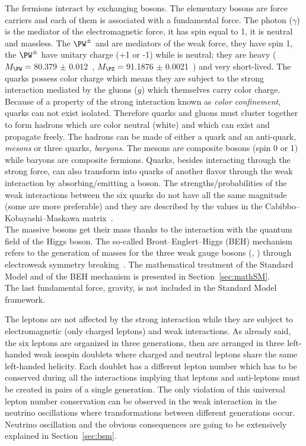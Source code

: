 The fermions interact by exchanging bosons. The elementary bosons are force carriers and each of them is associated with a fundamental force. The photon ($\gamma$) is the mediator of the electromagnetic force, it has spin equal to 1, it is neutral and massless. The $\PW^{\pm}$ and \PZ are mediators of the weak force, they have spin 1, the $\PW^{\pm}$ have unitary charge (+1 or -1) while \PZ is neutral; they are heavy ($M_\PW =\:$80.379 $\pm$ 0.012\GeV~\cite{pdgw}, $M_\PZ =\:$91.1876 $\pm$ 0.0021\GeV~\cite{pdgz}) and very short-lived. The quarks possess color charge which means they are subject to the strong interaction mediated by the gluons ($g$) which themselves carry color charge. Because of a property of the strong interaction known as \emph{color confinement}, quarks can not exist isolated. Therefore quarks and gluons must cluster together to form hadrons which are color neutral (white) and which can exist and propagate freely. The hadrons can be made of either a quark and an anti-quark, \emph{mesons} or three quarks, \emph{baryons}. The mesons are composite bosons (spin 0 or 1) while baryons are composite fermions. Quarks, besides interacting through the strong force, can also transform into quarks of another flavor through the weak interaction by absorbing/emitting a \PW boson. The strengths/probabilities of the weak interactions between the six quarks do not have all the same magnitude (some are more preferable) and they are described by the values in the Cabibbo–Kobayashi–Maskawa matrix~\cite{10.1143/PTP.28.870}.\\
The massive bosons get their mass thanks to the interaction with the quantum field of the Higgs boson. The so-called Brout–Englert–Higgs (BEH) mechanism refers to the generation of masses for the three weak gauge bosons (\PW, \PZ) through electroweak symmetry breaking~\cite{PhysRevLett.13.321,PhysRevLett.13.508}. The mathematical treatment of the Standard Model and of the BEH mechanism is presented in Section~\ref{sec:mathSM}.\\
The last fundamental force, gravity, is not included in the Standard Model framework. 

The leptons are not affected by the strong interaction while they are subject to electromagnetic (only charged leptons) and weak interactions. As already said, the six leptons are organized in three generations, then are arranged in three left-handed weak isospin doublets where charged and neutral leptons share the same left-handed helicity. Each doublet has a different lepton number which has to be conserved during all the interactions implying that leptons and anti-leptons must be created in pairs of a single generation. The only violation of this universal lepton number conservation can be observed in the weak interaction in the neutrino oscillations where transformations between different generations occur. Neutrino oscillation and the obvious consequences are going to be extensively explained in Section~\ref{sec:bsm}. 


